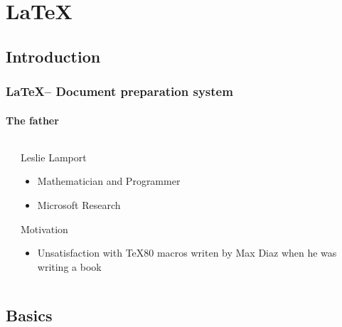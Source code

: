 \documentclass{beamer}
\begin{document}
\section{\LaTeX}

\subsection{Introduction}

\begin{frame}
  \frametitle{\LaTeX -- Document preparation system}
  \framesubtitle{The father}
  
  \begin{columns}
    
    \begin{column}{2.5cm}
    \end{column}
    
    \begin{column}{6.5cm}
      \begin{block}{Leslie Lamport}
        \begin{itemize}
          \item Mathematician and Programmer
        \item Microsoft Research
        \end{itemize}
      \end{block}

      \begin{alertblock}{Motivation}
        \begin{itemize}
          \item Unsatisfaction with \TeX 80  macros writen by Max Diaz when he was writing a book
        \end{itemize}
      \end{alertblock}
    \end{column}
    
  \end{columns}
\end{frame}

\subsection{Basics}
\end{document}
